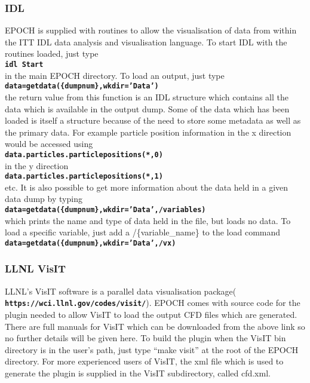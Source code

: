 \documentclass[12pt]{article}
\newcommand{\inlinecode}[1]{{\color{warwickred} \bf\texttt{#1}}}
\newcommand{\EPOCH}{{\color{warwickdark}\fontfamily{phv}\selectfont EPOCH} }
\begin{document}
\subsubsection{IDL}
\EPOCH is supplied with routines to allow the visualisation of data from
within the ITT IDL data analysis and visualisation language. To start IDL with
the routines loaded, just type\\
\inlinecode{idl Start}\\
in the main \EPOCH directory. To load an output, just type\\
\inlinecode{data=getdata(\{dumpnum\},wkdir='Data')}\\
the return value from this function is an IDL structure which contains all the
data which is available in the output dump. Some of the data which has been
loaded is itself a structure because of the need to store some metadata as
well as the primary data. For example particle position information in the x
direction would be accessed using\\
\inlinecode{data.particles.particlepositions(*,0)}\\
in the y direction\\
\inlinecode{data.particles.particlepositions(*,1)}\\
etc. It is also possible to get more information about the data held in a
given data dump by typing\\
\inlinecode{data=getdata(\{dumpnum\},wkdir='Data',/variables)}\\
which prints the name and type of data held in the file, but loads no data. To
load a specific variable, just add a /\{variable\_name\} to the load command\\
\inlinecode{data=getdata(\{dumpnum\},wkdir='Data',/vx)}\\

\subsubsection{LLNL VisIT}
LLNL's VisIT software is a parallel data visualisation
package(\inlinecode{https://wci.llnl.gov/codes/visit/}). \EPOCH comes with
source code for the plugin needed to allow VisIT to load the output CFD files
which are generated. There are full manuals for VisIT which can be downloaded
from the above link so no further details will be given here. To build the
plugin when the VisIT bin directory is in the user's path, just type ``make
visit'' at the root of the \EPOCH directory. For more experienced users of
VisIT, the xml file which is used to generate the plugin is supplied in the
VisIT subdirectory, called cfd.xml.
\end{document}
